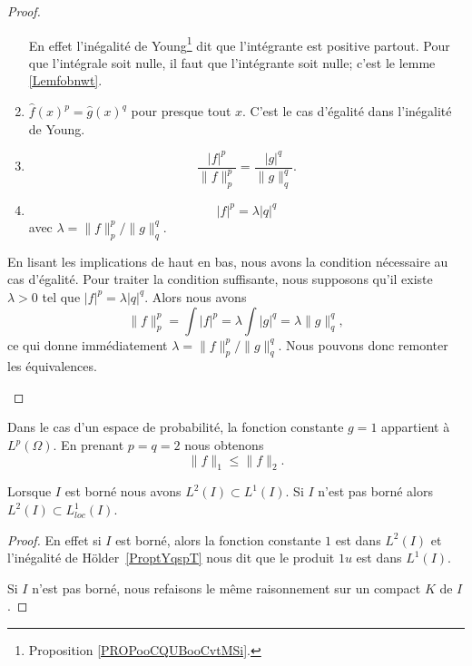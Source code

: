 \begin{proof}
\begin{subproof}
\begin{subproof}
\begin{enumerate}
				      En effet l'inégalité de Young\footnote{Proposition \ref{PROPooCQUBooCvtMSi}.} dit que l'intégrante est positive partout. Pour que l'intégrale soit nulle, il faut que l'intégrante soit nulle; c'est le lemme \ref{Lemfobnwt}.
				\item \( \hat f(x)^p=\hat g(x)^q\) pour presque tout \( x\). C'est le cas d'égalité dans l'inégalité de Young.
				\item
				      \begin{equation}
					      \frac{ | f |^p }{ \| f \|_p^p }=\frac{ | g |^q }{ \| g \|_q^q }.
				      \end{equation}
				\item
				      \begin{equation}
					      | f |^p=\lambda | q |^q
				      \end{equation}
				      avec \( \lambda=\| f \|_p^p/\| g \|_q^q\).
			\end{enumerate}
			\spitem[Conclusion]
			En lisant les implications de haut en bas, nous avons la condition nécessaire au cas d'égalité. Pour traiter la condition suffisante, nous supposons qu'il existe \( \lambda>0\) tel que \( | f |^p=\lambda| q |^q\). Alors nous avons
			\begin{equation}
				\| f \|_p^p=\int| f |^p=\lambda\int| g |^q=\lambda\| g \|_q^q,
			\end{equation}
			ce qui donne immédiatement \( \lambda=\| f \|_p^p/\| g \|_q^q\). Nous pouvons donc remonter les équivalences.
		\end{subproof}
	\end{subproof}
\end{proof}


\begin{remark}      \label{RemNormuptNird}
	Dans le cas d'un espace de probabilité, la fonction constante \( g=1\) appartient à \( L^p(\Omega)\). En prenant \( p=q=2\) nous obtenons
	\begin{equation}
		\| f \|_1\leq\| f \|_2.
	\end{equation}
\end{remark}

\begin{lemma}   \label{LemTLHwYzD}
	Lorsque \( I\) est borné nous avons \( L^2(I)\subset L^1(I)\). Si \( I\) n'est pas borné alors \( L^2(I)\subset L^1_{loc}(I)\).
\end{lemma}

\begin{proof}
	En effet si \( I\) est borné, alors la fonction constante \( 1\) est dans \( L^2(I)\) et l'inégalité de Hölder~\ref{ProptYqspT} nous dit que le produit \( 1u\) est dans \( L^1(I)\).

	Si \( I\) n'est pas borné, nous refaisons le même raisonnement sur un compact \( K\) de \( I\).
\end{proof}

